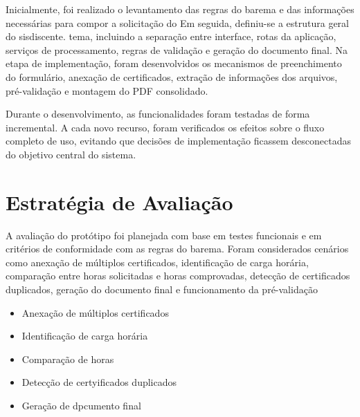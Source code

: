 Inicialmente, foi realizado o levantamento das regras do barema e das informações necessárias para compor a solicitação do Em seguida, definiu-se a estrutura geral do sisdiscente. tema, incluindo a separação entre interface, rotas da aplicação, serviços de processamento, regras de validação e geração do documento final. Na etapa de implementação, foram desenvolvidos os mecanismos de preenchimento do formulário, anexação de certificados, extração de informações dos arquivos, pré-validação e montagem do PDF consolidado.


Durante o desenvolvimento, as funcionalidades foram testadas de forma incremental. A cada novo recurso, foram verificados os efeitos sobre o fluxo completo de uso, evitando que decisões de implementação ficassem desconectadas do objetivo central do sistema.

\section{Estratégia de Avaliação}

A avaliação do protótipo foi planejada com base em testes funcionais e em critérios de conformidade com as regras do barema. Foram considerados cenários como anexação de múltiplos certificados, identificação de carga horária, comparação entre horas solicitadas e horas comprovadas, detecção de certificados duplicados, geração do documento final e funcionamento da pré-validação


\begin{itemize}
    \item Anexação de múltiplos certificados
    \item Identificação de carga horária
    \item Comparação de horas
    \item Detecção de certyificados duplicados
    \item Geração de dpcumento final
\end{itemize}

